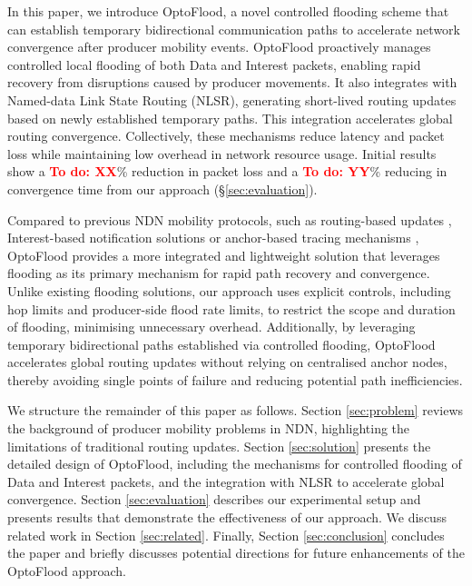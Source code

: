 \documentclass[10pt,conference]{IEEEtran}
\newcommand{\todo}[1]{\textbf{\textcolor{red}{To do: #1}}}
\begin{document}
In this paper, we introduce OptoFlood, a novel controlled flooding scheme that can establish temporary bidirectional communication paths to accelerate network convergence after producer mobility events. OptoFlood proactively manages controlled local flooding of both Data and Interest packets, enabling rapid recovery from disruptions caused by producer movements. 
It also integrates
with Named-data Link State Routing (NLSR), generating short-lived routing updates based on newly established temporary paths. This integration accelerates global routing convergence. Collectively, these mechanisms reduce latency and packet loss while maintaining low overhead in network resource usage.
Initial results show a \todo{XX}\% reduction in packet loss and a \todo{YY}\% reducing in convergence time from our approach (\S\ref{sec:evaluation}).

Compared to previous NDN mobility protocols, such as routing-based updates \cite{meddeb:2018:afirm}, Interest-based notification solutions \cite{auge:2016:map-me} or anchor-based tracing mechanisms \cite{zhang:2018:kite},
OptoFlood provides a more integrated and lightweight solution that leverages flooding as its primary mechanism for rapid path recovery and convergence. Unlike existing flooding solutions, our approach uses explicit controls, including hop limits and producer-side flood rate limits, to restrict the scope and duration of flooding, minimising unnecessary overhead. Additionally, by leveraging temporary bidirectional paths established via controlled flooding, OptoFlood accelerates global routing updates without relying on centralised anchor nodes, thereby avoiding single points of failure and reducing potential path inefficiencies.

We structure the remainder of this paper as follows. Section \ref{sec:problem} reviews the background of producer mobility problems in NDN, highlighting the limitations of traditional routing updates. Section \ref{sec:solution} presents the detailed design of OptoFlood, including the mechanisms for controlled flooding of Data and Interest packets, and the integration with NLSR to accelerate global convergence. Section \ref{sec:evaluation} describes our experimental setup and presents results that demonstrate the effectiveness of our approach. 
We discuss related work in Section \ref{sec:related}.
Finally, Section \ref{sec:conclusion} concludes the paper and briefly discusses potential directions for future enhancements of the OptoFlood approach.
\end{document}
